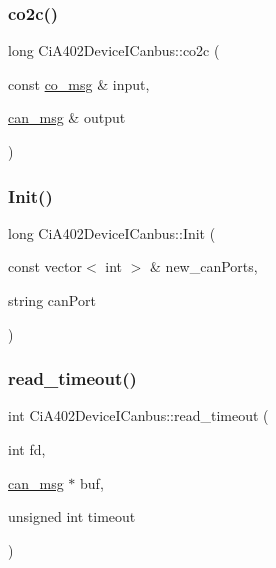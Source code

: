 \subsubsection{\texorpdfstring{co2c()}{co2c()}}
{\footnotesize\ttfamily long Ci\+A402\+Device\+I\+Canbus\+::co2c (\begin{DoxyParamCaption}\item[{const \hyperlink{structco__msg}{co\+\_\+msg} \&}]{input,  }\item[{\hyperlink{structcan__msg}{can\+\_\+msg} \&}]{output }\end{DoxyParamCaption})}

\mbox{\label{classCiA402DeviceICanbus_a757447054eadb6824cf779ca58d276ae}} 
\subsubsection{\texorpdfstring{Init()}{Init()}}
{\footnotesize\ttfamily long Ci\+A402\+Device\+I\+Canbus\+::\+Init (\begin{DoxyParamCaption}\item[{const vector$<$ int $>$ \&}]{new\+\_\+can\+Ports,  }\item[{string}]{can\+Port }\end{DoxyParamCaption})}

\mbox{\label{classCiA402DeviceICanbus_a2ef5507ddae8411aae5b6e47e611ab92}} 
\subsubsection{\texorpdfstring{read\+\_\+timeout()}{read\_timeout()}}
{\footnotesize\ttfamily int Ci\+A402\+Device\+I\+Canbus\+::read\+\_\+timeout (\begin{DoxyParamCaption}\item[{int}]{fd,  }\item[{\hyperlink{structcan__msg}{can\+\_\+msg} $\ast$}]{buf,  }\item[{unsigned int}]{timeout }\end{DoxyParamCaption})\hspace{0.3cm}{\ttfamily [private]}}

